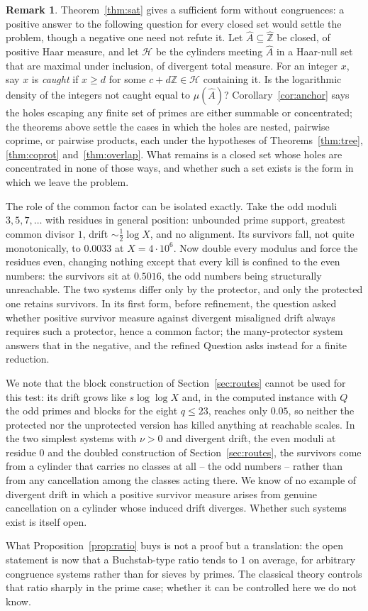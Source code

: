 \documentclass[11pt]{article}
\theoremstyle{plain}
\theoremstyle{definition}
\newtheorem{remark}[theorem]{Remark}
\newcommand{\Zhat}{\widehat{\mathbb{Z}}}
\newcommand{\Ahat}{\widehat{A}}
\begin{document}
\begin{remark}
Theorem~\ref{thm:sat} gives a sufficient form without congruences:
a positive answer to the following question for every closed set
would settle the problem, though a negative one need not refute
it.
Let $\Ahat\subseteq\Zhat$ be closed, of positive Haar measure,
and let $\mathcal{H}$ be the cylinders meeting $\Ahat$ in a
Haar-null set that are maximal under inclusion, of divergent
total measure.  For an integer $x$, say $x$ is
\emph{caught} if $x\ge d$ for some $c+d\mathbb{Z}\in\mathcal{H}$
containing it.  Is the logarithmic density of the integers not
caught equal to $\mu(\Ahat)$?  Corollary~\ref{cor:anchor} says the
holes escaping any finite set of primes are either summable or
concentrated; the theorems above settle the cases in which the holes are
nested, pairwise coprime, or pairwise products, each under the
hypotheses of Theorems~\ref{thm:tree}, \ref{thm:coprot}
and~\ref{thm:overlap}.  What remains is a closed set whose holes
are concentrated in none of those ways, and whether such a set
exists is the form in which we leave the problem.

The role of the common factor can be isolated exactly.  Take the
odd moduli $3,5,7,\dots$ with residues in general position:
unbounded prime support, greatest common divisor $1$, drift
$\sim\tfrac12\log X$, and no alignment.  Its survivors fall, not quite monotonically, to
$0.0033$ at $X=4\cdot10^6$.  Now double every modulus and force
the residues even, changing nothing except that every kill is
confined to the even numbers: the survivors sit at $0.5016$, the
odd numbers being structurally unreachable.  The two systems
differ only by the protector, and only the protected one retains
survivors.  In its first form, before refinement, the question asked whether positive survivor
measure against divergent misaligned drift always requires such
a protector, hence a common factor; the many-protector system
answers that in the negative, and the refined Question asks
instead for a finite reduction.

We note that the block construction of Section~\ref{sec:routes} cannot be used
for this test: its drift grows like $s\log\log X$ and, in the computed instance
with $Q$ the odd primes and blocks for the eight $q\le23$,
reaches only $0.05$, so neither the protected nor the
unprotected version has killed anything at reachable scales.  In the two simplest systems with $\nu>0$ and divergent drift,
the even moduli at residue $0$ and the doubled construction of
Section~\ref{sec:routes}, the survivors come from a cylinder that carries no
classes at all -- the odd numbers -- rather than from any
cancellation among the classes
acting there.  We know of no example of divergent drift in which a positive
survivor measure arises from genuine cancellation on a cylinder
whose induced drift diverges.  Whether such systems exist is itself
open.

What Proposition~\ref{prop:ratio} buys is not a proof but a
translation: the open statement is now that a Buchstab-type
ratio tends to $1$ on average, for arbitrary congruence systems
rather than for sieves by primes.  The classical theory
controls that ratio sharply in the prime case; whether it can be
controlled here we do not know.
\end{remark}
\end{document}
